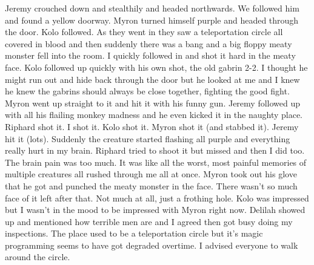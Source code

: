 \begin{multicols}{2}
Jeremy crouched down and stealthily and headed northwards. We followed him and found a yellow doorway. Myron turned himself purple and headed through the door. Kolo followed. As they went in they saw a teleportation circle all covered in blood and then suddenly there was a bang and a big floppy meaty monster fell into the room. I quickly followed in and shot it hard in the meaty face. Kolo followed up quickly with his own shot, the old gabrin 2-2. I thought he might run out and hide back through the door but he looked at me and I knew he knew the gabrins should always be close together, fighting the good fight. Myron went up straight to it and hit it with his funny gun. Jeremy followed up with all his flailing monkey madness and he even kicked it in the naughty place. Riphard shot it. I shot it. Kolo shot it. Myron shot it (and stabbed it). Jeremy hit it (lots). Suddenly the creature started flashing all purple and everything really hurt in my brain. Riphard tried to shoot it but missed and then I did too. The brain pain was too much. It was like all the worst, most painful memories of multiple creatures all rushed through me all at once. Myron took out his glove that he got and punched the meaty monster in the face. There wasn’t so much face of it left after that. Not much at all, just a frothing hole. Kolo was impressed but I wasn’t in the mood to be impressed with Myron right now. Delilah showed up and mentioned how terrible men are and I agreed then got busy doing my inspections. The place used to be a teleportation circle but it’s magic programming seems to have got degraded overtime. I advised everyone to walk around the circle.\medskip


\end{multicols}

